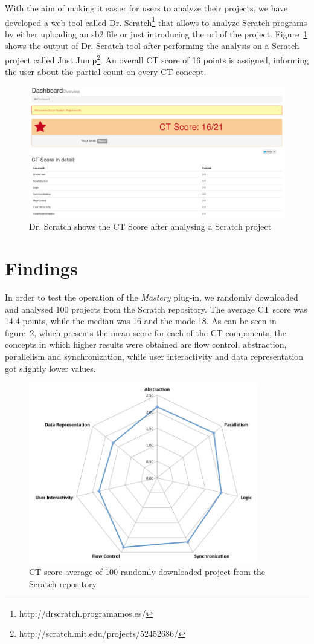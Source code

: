 \documentclass[a4paper,11pt]{article}
\begin{document}
With the aim of making it easier for users to analyze their projects, we have developed a web tool called Dr. Scratch\footnote{http://drscratch.programamos.es/} that allows to analyze Scratch programs by either uploading an sb2 file or just introducing the url of the project. Figure~\ref{fig:drscratch} shows the output of Dr. Scratch tool after performing the analysis on a Scratch project called Just Jump\footnote{http://scratch.mit.edu/projects/52452686/}. An overall CT score of 16 points is assigned, informing the user about the partial count on every CT concept.
\begin{figure}
  \centering
    \includegraphics[width=13cm]{img/results.png}
    \caption{Dr. Scratch shows the CT Score after analysing a Scratch project}
    \label{fig:drscratch}
\end{figure}

\section{Findings}
\label{sec:findings}

In order to test the operation of the \textit{Mastery} plug-in, we randomly downloaded and analysed 100 projects from the Scratch repository. The average CT score was 14.4 points, while the median was 16 and the mode 18. As can be seen in figure~\ref{fig:scores}, which presents the mean score for each of the CT components, the concepts in which higher results were obtained are flow control, abstraction, parallelism and synchronization, while user interactivity and data representation got slightly lower values.
\begin{figure}
  \centering
    \includegraphics[width=10cm]{img/spider.png}
    \caption{CT score average of 100 randomly downloaded project from the Scratch repository}
    \label{fig:scores}
\end{figure}
\end{document}
